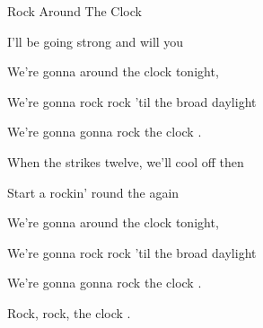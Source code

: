 \begin{SBSong}{Rock Around The Clock}
\begin{SBVerse}
    I'll be going strong and  will you
    
    We're gonna  around the clock tonight,
    
    We're gonna  rock rock 'til the broad daylight
    
    We're gonna  gonna rock  the clock .

  \end{SBVerse} 
  \begin{SBVerse}  
    When the  strikes twelve, we'll cool off then
    
    Start a rockin' round the  again
    
    We're gonna  around the clock tonight,
    
    We're gonna  rock rock 'til the broad daylight
    
    We're gonna  gonna rock  the clock .
    
    Rock, rock,   the clock . 
  \end{SBVerse}
\end{SBSong}
